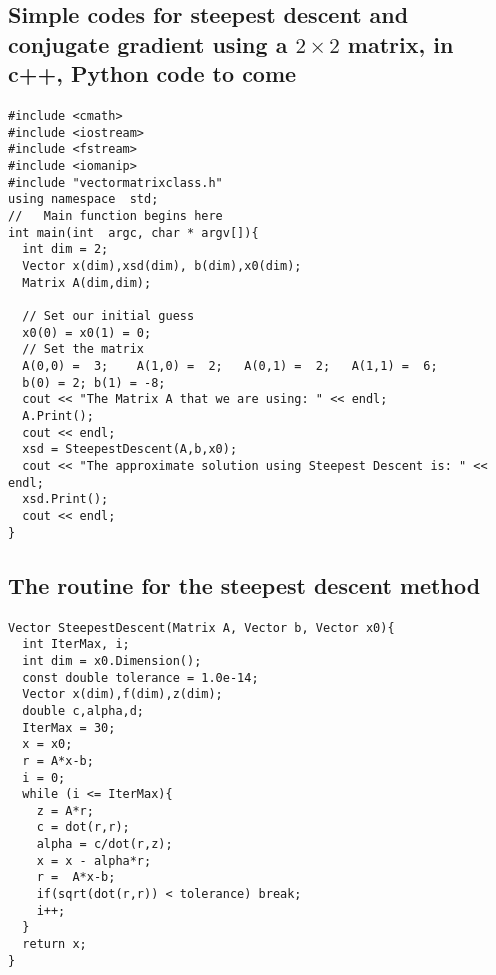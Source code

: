 \documentclass[%
oneside,                 %
final,                   %
10pt]{article}
\begin{document}
\subsection*{Simple codes for  steepest descent and conjugate gradient using a $2\times 2$ matrix, in c++, Python code to come}

\paragraph{}
\begin{verbatim}
#include <cmath>
#include <iostream>
#include <fstream>
#include <iomanip>
#include "vectormatrixclass.h"
using namespace  std;
//   Main function begins here
int main(int  argc, char * argv[]){
  int dim = 2;
  Vector x(dim),xsd(dim), b(dim),x0(dim);
  Matrix A(dim,dim);

  // Set our initial guess
  x0(0) = x0(1) = 0;
  // Set the matrix
  A(0,0) =  3;    A(1,0) =  2;   A(0,1) =  2;   A(1,1) =  6;
  b(0) = 2; b(1) = -8;
  cout << "The Matrix A that we are using: " << endl;
  A.Print();
  cout << endl;
  xsd = SteepestDescent(A,b,x0);
  cout << "The approximate solution using Steepest Descent is: " << endl;
  xsd.Print();
  cout << endl;
}
\end{verbatim}



\subsection*{The routine for the steepest descent method}

\paragraph{}
\begin{verbatim}
Vector SteepestDescent(Matrix A, Vector b, Vector x0){
  int IterMax, i;
  int dim = x0.Dimension();
  const double tolerance = 1.0e-14;
  Vector x(dim),f(dim),z(dim);
  double c,alpha,d;
  IterMax = 30;
  x = x0;
  r = A*x-b;
  i = 0;
  while (i <= IterMax){
    z = A*r;
    c = dot(r,r);
    alpha = c/dot(r,z);
    x = x - alpha*r;
    r =  A*x-b;
    if(sqrt(dot(r,r)) < tolerance) break;
    i++;
  }
  return x;
}
\end{verbatim}
\end{document}

